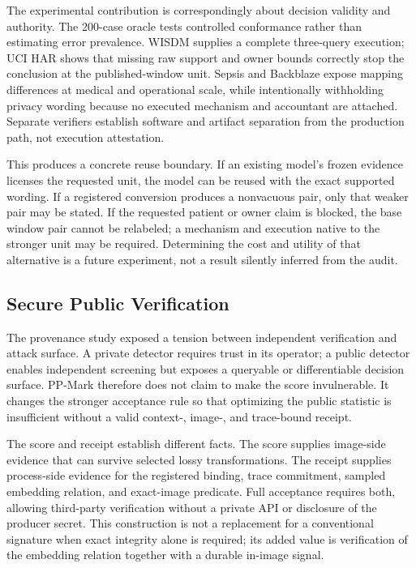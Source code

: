The experimental contribution is correspondingly about decision validity and
authority.  The 200-case oracle tests controlled conformance rather than estimating
error prevalence.  WISDM supplies a complete three-query execution; UCI HAR shows
that missing raw support and owner bounds correctly stop the conclusion at the
published-window unit.  Sepsis and Backblaze expose mapping differences at medical
and operational scale, while intentionally withholding privacy wording because no
executed mechanism and accountant are attached.  Separate verifiers establish
software and artifact separation from the production path, not execution
attestation.

This produces a concrete reuse boundary.  If an existing model's frozen evidence
licenses the requested unit, the model can be reused with the exact supported
wording.  If a registered conversion produces a nonvacuous pair, only that weaker
pair may be stated.  If the requested patient or owner claim is blocked, the base
window pair cannot be relabeled; a mechanism and execution native to the stronger
unit may be required.  Determining the cost and utility of that alternative is a
future experiment, not a result silently inferred from the audit.

\subsection{Secure Public Verification}
\label{subsec:ch5-secure-public-verification}

The provenance study exposed a tension between independent verification and
attack surface.  A private detector requires trust in its operator; a public
detector enables independent screening but exposes a queryable or differentiable
decision surface.  PP-Mark therefore does not claim to make the score invulnerable.
It changes the stronger acceptance rule so that optimizing the public statistic is
insufficient without a valid context-, image-, and trace-bound receipt.

The score and receipt establish different facts.  The score supplies image-side
evidence that can survive selected lossy transformations.  The receipt supplies
process-side evidence for the registered binding, trace commitment, sampled
embedding relation, and exact-image predicate.  Full acceptance requires both,
allowing third-party verification without a private API or disclosure of the
producer secret.  This construction is not a replacement for a conventional
signature when exact integrity alone is required; its added value is verification
of the embedding relation together with a durable in-image signal.

